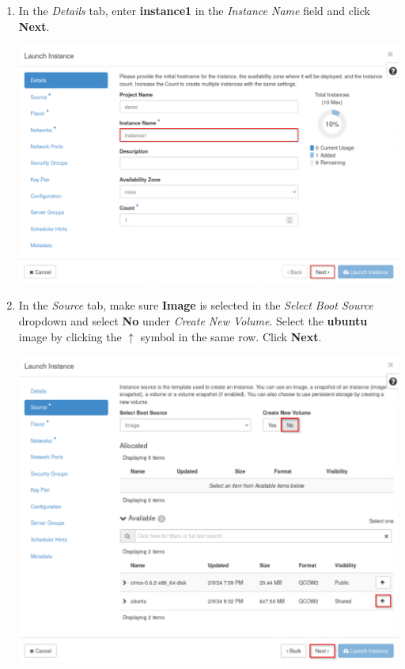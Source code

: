 \documentclass[letterpaper, 12pt]{article}
\begin{document}
\begin{enumerate}
    \item In the \textit{Details} tab, enter \textbf{instance1} in the \textit{Instance Name} field and click \textbf{Next}.

    \begin{center}
        \includegraphics[width=\linewidth]{images/part1/step5.png}
    \end{center}

    \item In the \textit{Source} tab, make sure \textbf{Image} is selected in the \textit{Select Boot Source} dropdown and select \textbf{No} under \textit{Create New Volume}.
    Select the \textbf{ubuntu} image by clicking the $\uparrow$ symbol in the same row.
    Click \textbf{Next}.

    \begin{center}
        \includegraphics[width=\linewidth]{images/part1/step6.png}
    \end{center}


\end{enumerate}
\end{document}
